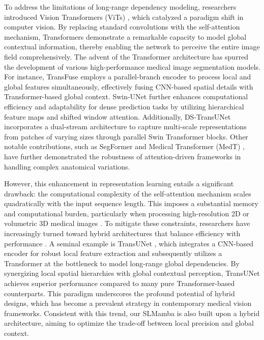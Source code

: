 \documentclass[runningheads]{llncs}
\begin{document}
To address the limitations of long-range dependency modeling, researchers introduced Vision Transformers (ViTs) \cite{dosovitskiy2020vit}, which catalyzed a paradigm shift in computer vision. By replacing standard convolutions with the self-attention mechanism, Transformers demonstrate a remarkable capacity to model global contextual information, thereby enabling the network to perceive the entire image field comprehensively. The advent of the Transformer architecture has spurred the development of various high-performance medical image segmentation models. For instance, TransFuse \cite{zhang2021transfuse} employs a parallel-branch encoder to process local and global features simultaneously, effectively fusing CNN-based spatial details with Transformer-based global context. Swin-UNet \cite{cao2023swin} further enhances computational efficiency and adaptability for dense prediction tasks by utilizing hierarchical feature maps and shifted window attention. Additionally, DS-TransUNet \cite{lin2022ds} incorporates a dual-stream architecture to capture multi-scale representations from patches of varying sizes through parallel Swin Transformer blocks. Other notable contributions, such as SegFormer \cite{xie2021segformer} and Medical Transformer (MedT) \cite{valanarasu2021medical}, have further demonstrated the robustness of attention-driven frameworks in handling complex anatomical variations.

However, this enhancement in representation learning entails a significant drawback: the computational complexity of the self-attention mechanism scales quadratically with the input sequence length. This imposes a substantial memory and computational burden, particularly when processing high-resolution 2D or volumetric 3D medical images \cite{vaswani2017attention, hatamizadeh2022unetr}. To mitigate these constraints, researchers have increasingly turned toward hybrid architectures that balance efficiency with performance \cite{xie2021cotr}. A seminal example is TransUNet \cite{chen2021transunet}, which integrates a CNN-based encoder for robust local feature extraction and subsequently utilizes a Transformer at the bottleneck to model long-range global dependencies. By synergizing local spatial hierarchies with global contextual perception, TransUNet achieves superior performance compared to many pure Transformer-based counterparts. This paradigm underscores the profound potential of hybrid designs, which has become a prevalent strategy in contemporary medical vision frameworks. Consistent with this trend, our SLMamba is also built upon a hybrid architecture, aiming to optimize the trade-off between local precision and global context.
\end{document}
